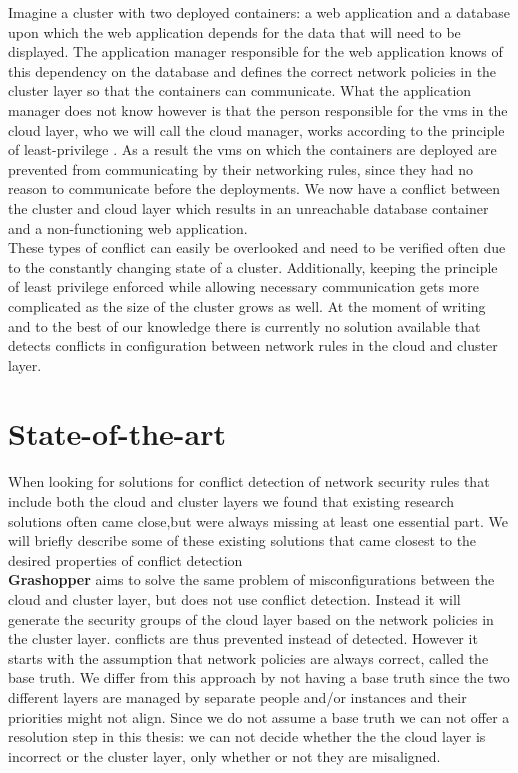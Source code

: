 Imagine a cluster with two deployed containers: a web application and a database upon which the web application depends for the data that will need to be displayed. The application manager responsible for the web application knows of this dependency on the database and defines the correct network policies in the cluster layer so that the containers can communicate. What the application manager does not know however is that the person responsible for the \acrshort{vm}s in the cloud layer, who we will call the cloud manager, works according to the principle of least-privilege \cite{leastprivilige}. As a result the \acrshort{vm}s on which the containers are deployed are prevented from communicating by their networking rules, since they had no reason to communicate before the deployments. We now have a conflict between the cluster and cloud layer which results in an unreachable database container and a non-functioning web application.
\\[10pt]

These types of conflict can easily be overlooked and need to be verified often due to the constantly changing state of a cluster. Additionally, keeping the principle of least privilege enforced while allowing necessary communication gets more complicated as the size of the cluster grows as well. At the moment of writing and to the best of our knowledge there is currently no solution available that detects conflicts in configuration between network rules in the cloud and cluster layer.
\\[10pt]

\section{State-of-the-art} \label{sec:stateoftheart}
When looking for solutions for conflict detection of network security rules that include both the cloud and cluster layers we found that existing research solutions often came close,but were always missing at least one essential part. We will briefly describe some of these existing solutions that came closest to the desired properties of conflict detection
\\[10pt]

\textbf{Grashopper} \cite{grashopper}  aims to solve the same problem of misconfigurations between the cloud and cluster layer, but does not use conflict detection. Instead it will generate the security groups of the cloud layer based on the network policies in the cluster layer. conflicts are thus prevented instead of detected. However it starts with the assumption that network policies are always correct, called the base truth. We differ from this approach by not having a base truth since the two different layers are managed by separate people and/or instances and their priorities might not align. Since we do not assume a base truth we can not offer a resolution step in this thesis: we can not decide whether the the cloud layer is incorrect or the cluster layer, only whether or not they are misaligned.
\\[10pt]


